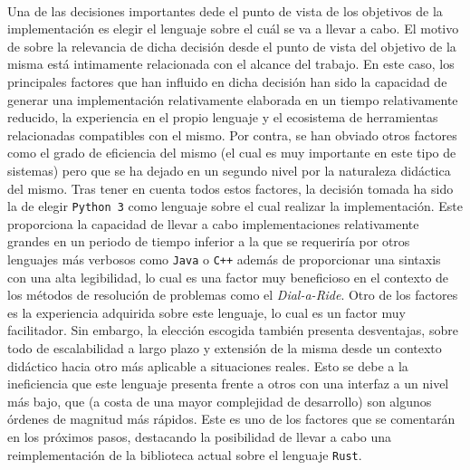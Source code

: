 \documentclass{subfiles}
\begin{document}
        \paragraph{}
        Una de las decisiones importantes dede el punto de vista de los objetivos de la implementación es elegir el lenguaje sobre el cuál se va a llevar a cabo. El motivo de sobre la relevancia de dicha decisión desde el punto de vista del objetivo de la misma está intimamente relacionada con el alcance del trabajo. En este caso, los principales factores que han influido en dicha decisión han sido la capacidad de generar una implementación relativamente elaborada en un tiempo relativamente reducido, la experiencia en el propio lenguaje y el ecosistema de herramientas relacionadas compatibles con el mismo. Por contra, se han obviado otros factores como el grado de eficiencia del mismo (el cual es muy importante en este tipo de sistemas) pero que se ha dejado en un segundo nivel por la naturaleza didáctica del mismo. Tras tener en cuenta todos estos factores, la decisión tomada ha sido la de elegir \texttt{Python 3} \cite{rossum1995python} como lenguaje sobre el cual realizar la implementación. Este proporciona la capacidad de llevar a cabo implementaciones relativamente grandes en un periodo de tiempo inferior a la que se requeriría por otros lenguajes más verbosos como \texttt{Java} o \texttt{C++} además de proporcionar una sintaxis con una alta legibilidad, lo cual es una factor muy beneficioso en el contexto de los métodos de resolución de problemas como el \emph{Dial-a-Ride}. Otro de los factores es la experiencia adquirida sobre este lenguaje, lo cual es un factor muy facilitador. Sin embargo, la elección escogida también presenta desventajas, sobre todo de escalabilidad a largo plazo y extensión de la misma desde un contexto didáctico hacia otro más aplicable a situaciones reales. Esto se debe a la ineficiencia que este lenguaje presenta frente a otros con una interfaz a un nivel más bajo, que (a costa de una mayor complejidad de desarrollo) son algunos órdenes de magnitud más rápidos. Este es uno de los factores que se comentarán en los próximos pasos, destacando la posibilidad de llevar a cabo una reimplementación de la biblioteca actual sobre el lenguaje \texttt{Rust}.
\end{document}
